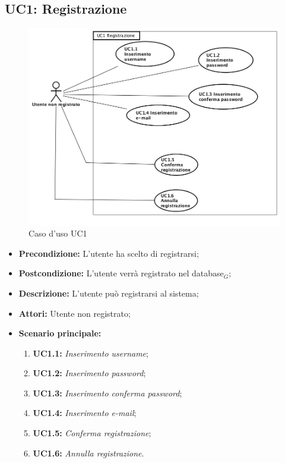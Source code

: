 \subsection{ UC1: Registrazione}

\begin{figure}[h]
	\begin{center}
	\includegraphics[scale=0.4]{diagram/UC1.png}
	\caption{Caso d'uso UC1}
	\end{center}
\end{figure}
\begin{itemize}
	\item \textbf{Precondizione:} L'utente ha scelto di registrarsi;
	\item \textbf{Postcondizione:} L'utente verrà registrato nel database$_G$;
	\item \textbf{Descrizione:} L'utente può registrarsi al sistema;
	\item \textbf{Attori:} Utente non registrato;
	\item \textbf{Scenario principale:}
	\begin{enumerate}
		\item \textbf{ UC1.1:} \textit{ Inserimento username};
		\item \textbf{ UC1.2:} \textit{ Inserimento password};
		\item \textbf{ UC1.3:} \textit{ Inserimento conferma password};
		\item \textbf{ UC1.4:} \textit{ Inserimento e-mail};
		\item \textbf{ UC1.5:} \textit{ Conferma registrazione};
		\item \textbf{ UC1.6:} \textit{ Annulla registrazione}.
	\end{enumerate}
\end{itemize}
